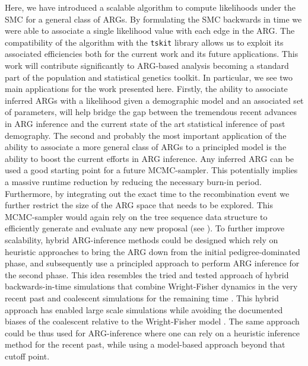 \documentclass{article}
\begin{document}
Here, we have introduced a scalable algorithm to compute likelihoods
under the SMC for a general class of ARGs. By formulating the SMC backwards in time
we were able to associate a single likelihood value with each edge in the ARG.
The compatibility of the algorithm with the \texttt{tskit} library allows us to
exploit its associated efficiencies both for the current work and its future
applications. This work will contribute significantly
to ARG-based analysis becoming a standard part of the population
and statistical genetics toolkit.
In particular, we see two main applications for the work presented here.
Firstly, the ability to associate inferred ARGs with a likelihood given a demographic
model and an associated set of parameters, will help bridge the gap between the tremendous recent
advances in ARG inference and the current state of the art statistical inference of
past demography.
The second and probably the most important application of the ability to associate a more
general class of ARGs to a principled model is the ability to boost the current efforts
in ARG inference. 
Any inferred ARG can be used a good starting point
for a future MCMC-sampler. This potentially implies a massive runtime reduction by
reducing the necessary burn-in period. Furthermore, by integrating out the exact time
to the recombination event we further restrict the size of the ARG space that needs to
be explored. This MCMC-sampler would again rely on the tree sequence data structure to
efficiently generate and evaluate any new proposal (see \citep{mahmoudi_bayesian_2022}).
To further improve scalability, hybrid ARG-inference methods could be designed which
rely on heuristic approaches to bring the ARG down from the initial pedigree-dominated phase,
and subsequently use a principled approach to perform ARG inference for the second phase.
This idea resembles the tried and tested approach of hybrid backwards-in-time simulations 
that combine Wright-Fisher dynamics in the very recent past and coalescent simulations 
for the remaining time \citep{bhaskar_distortion_2014, nelson_accounting_2020}. This hybrid
approach has enabled large scale simulations while avoiding the documented biases of the
coalescent relative to the Wright-Fisher model \citep{bhaskar_distortion_2014, wakeley_gene_2012}. 
The same approach could be thus used for ARG-inference where one can rely on a heuristic 
inference method for the recent past, while using a model-based approach beyond that cutoff point.
\end{document}
